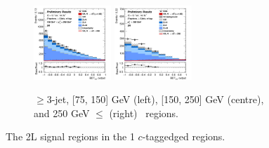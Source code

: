 \begin{figure}[h!]
\begin{subfigure}[b]{\textwidth}
        \includegraphics[width=0.32\textwidth]{Images/VH/Own_fit/prefit_VHcc/Region_distmva_BMax250_BMin150_DSR_J3_TTypent_incJet1_T1_L2_Y6051_Prefit.png}
        \includegraphics[width=0.32\textwidth]{Images/VH/Own_fit/prefit_VHcc/Region_distmva_BMin250_DSR_J3_TTypent_incJet1_T1_L2_Y6051_Prefit.png}
        \caption{$\geq$3-jet, [75, 150] GeV (left), [150, 250] GeV (centre), and 250  GeV $\leq$ (right) \ptv\ regions.}
        \label{fig:plots_VHcc_2L_SR_1c_3J}
    \end{subfigure}
    \caption{The 2L signal regions in the 1 $c$-taggedged regions.}
    \label{fig:plots_VHcc_2L_SR_1c}
\end{figure}

\newpage
\vspace*{\fill} 


